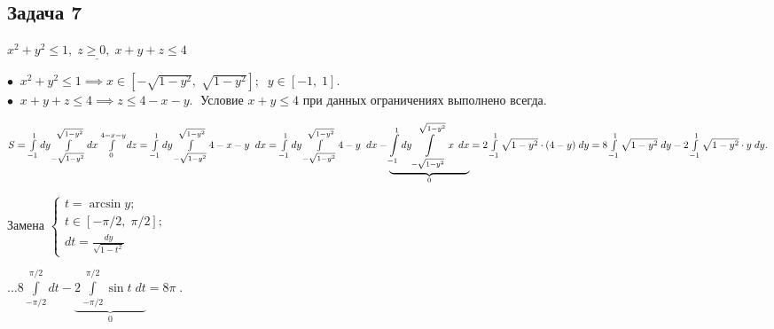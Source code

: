 \documentclass[a4paper, fleqn]{article}
\begin{document}
      \subsection*{Задача 7}
    
    $\underline{x^2 + y^2 \leq 1, \; z \geq 0, \; x + y + z \leq 4}$
    
    $\bullet \; \; x^2 + y^2 \leq 1 \implies x \in \left[-\sqrt{1 - y^2}, \; \sqrt{1 - y^2}\right]; \; \; y \in [-1, \; 1].$\\
    
    $\bullet \; \; x + y + z \leq 4 \implies z \leq 4 - x - y. \; $ Условие $x + y \leq 4$ при данных ограничениях выполнено всегда.
    
    $S = \int\limits_{-1}^{1}  dy \int\limits_{-\sqrt{1 - y^2}}^{\sqrt{1 - y^2}} dx \int\limits_{0}^{4 -x - y} dz =  \int\limits_{-1}^{1}  dy \int\limits_{-\sqrt{1 - y^2}}^{\sqrt{1 - y^2}} 4 -x - y \; \;  dx =  \int\limits_{-1}^{1}  dy \int\limits_{-\sqrt{1 - y^2}}^{\sqrt{1 - y^2}} 4 - y \; \; dx -  \underbrace{\int\limits_{-1}^{1}  dy \int\limits_{-\sqrt{1 - y^2}}^{\sqrt{1 - y^2}} x \, \; dx}_{0} = \\
    2 \int\limits_{-1}^{1}  \sqrt{1 - y^2} \cdot (4 - y) \;  dy = 
    8 \int\limits_{-1}^{1}  \sqrt{1 - y^2}  \;  dy - 2 \int\limits_{-1}^{1}  \sqrt{1 - y^2} \cdot  y \;  dy .$
    
    Замена $\begin{cases}
    t = \arcsin y;\\
    t \in \left[-\pi/2 , \; \pi/2\right];\\
    dt = \frac{dy}{\sqrt{1 - t^2}}
    \end{cases}$
    
    $\dots \displaystyle 8 \int\limits_{-\pi /2}^{\pi/2} dt - \underbrace{2 \int\limits_{-\pi /2}^{\pi/2} \sin t \; dt}_{0} = \boxed{8 \pi} \; . $
    
    
    
    
    
    
    
    
    
\end{document}
